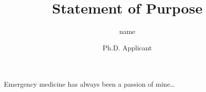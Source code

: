 \documentclass{article}
\title{Statement of Purpose}
\author{name}
\date{Ph.D. Applicant}
\begin{document}
  \maketitle%

  Emergency medicine has always been a passion of mine\ldots
\end{document}
